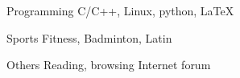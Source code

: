 \vspace{-6.0mm}


\begin{cvskills}


\cvskill
{Programming} %
{C/C++, Linux, python, \LaTeX} %

\cvskill
{Sports} %
{Fitness, Badminton, Latin} %

\cvskill
{Others} %
{Reading, browsing Internet forum} %

\end{cvskills}